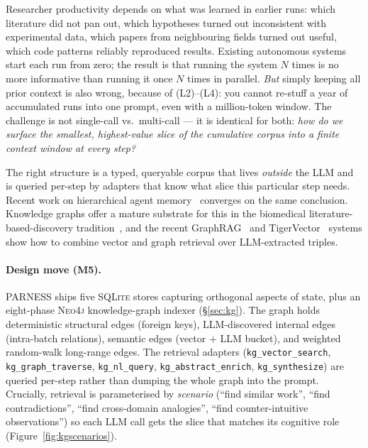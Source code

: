\documentclass{article}
\newcommand{\parness}{\textsf{PARNESS}}
\newcommand{\code}[1]{\texttt{\small #1}}
\begin{document}
Researcher productivity depends on what was learned in earlier runs:
which literature did not pan out, which hypotheses turned out
inconsistent with experimental data, which papers from neighbouring
fields turned out useful, which code patterns reliably reproduced
results. Existing autonomous systems start each run from zero; the
result is that running the system $N$ times is no more informative than
running it once $N$ times in parallel. \emph{But} simply keeping all
prior context is also wrong, because of (L2)--(L4): you cannot re-stuff
a year of accumulated runs into one prompt, even with a million-token
window. The challenge is not single-call vs.\ multi-call --- it is
identical for both: \emph{how do we surface the smallest, highest-value
slice of the cumulative corpus into a finite context window at every
step?}

The right structure is a typed, queryable corpus that lives
\emph{outside} the LLM and is queried per-step by adapters that know
what slice this particular step needs. Recent work on hierarchical
agent memory~\cite{hierarchicalmem,gmemory,shimi} converges on the same
conclusion. Knowledge graphs offer a mature substrate for this in the
biomedical literature-based-discovery
tradition~\cite{swansonlbd,lbdsemantic}, and the recent
GraphRAG~\cite{graphrag} and TigerVector~\cite{tigervector} systems
show how to combine vector and graph retrieval over LLM-extracted
triples.

\paragraph{Design move (M5).} \parness{} ships five \textsc{SQLite}
stores capturing orthogonal aspects of state, plus an eight-phase
\textsc{Neo4j} knowledge-graph indexer (\S\ref{sec:kg}). The graph
holds deterministic structural edges (foreign keys), LLM-discovered
internal edges (intra-batch relations), semantic edges (vector + LLM
bucket), and weighted random-walk long-range edges. The retrieval
adapters (\code{kg\_vector\_search}, \code{kg\_graph\_traverse},
\code{kg\_nl\_query}, \code{kg\_abstract\_enrich}, \code{kg\_synthesize})
are queried per-step rather than dumping the whole graph into the
prompt. Crucially, retrieval is parameterised by \emph{scenario}
(``find similar work'', ``find contradictions'', ``find cross-domain
analogies'', ``find counter-intuitive observations'') so each LLM call
gets the slice that matches its cognitive role
(Figure~\ref{fig:kgscenarios}).
\end{document}
